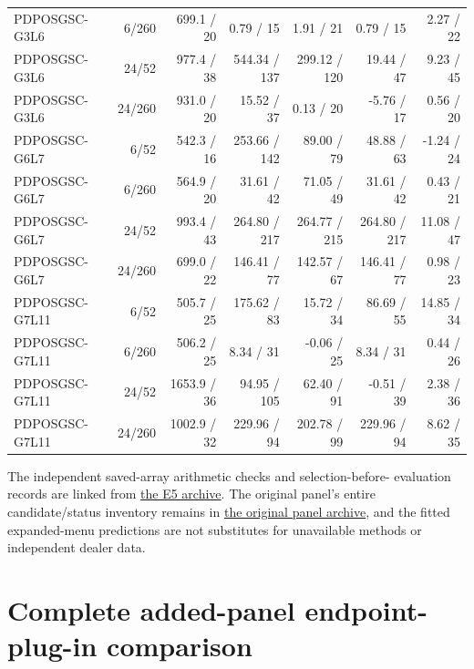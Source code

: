 \documentclass[11pt,a4paper]{article}
\begin{document}
\begin{longtable}{p{26mm}rrrrrr}
PDPOSGSC-G3L6 & 6/260 & 699.1 / 20 & 0.79 / 15 & 1.91 / 21 & 0.79 / 15 & 2.27 / 22 \\
PDPOSGSC-G3L6 & 24/52 & 977.4 / 38 & 544.34 / 137 & 299.12 / 120 & 19.44 / 47 & 9.23 / 45 \\
PDPOSGSC-G3L6 & 24/260 & 931.0 / 20 & 15.52 / 37 & 0.13 / 20 & -5.76 / 17 & 0.56 / 20 \\
PDPOSGSC-G6L7 & 6/52 & 542.3 / 16 & 253.66 / 142 & 89.00 / 79 & 48.88 / 63 & -1.24 / 24 \\
PDPOSGSC-G6L7 & 6/260 & 564.9 / 20 & 31.61 / 42 & 71.05 / 49 & 31.61 / 42 & 0.43 / 21 \\
PDPOSGSC-G6L7 & 24/52 & 993.4 / 43 & 264.80 / 217 & 264.77 / 215 & 264.80 / 217 & 11.08 / 47 \\
PDPOSGSC-G6L7 & 24/260 & 699.0 / 22 & 146.41 / 77 & 142.57 / 67 & 146.41 / 77 & 0.98 / 23 \\
PDPOSGSC-G7L11 & 6/52 & 505.7 / 25 & 175.62 / 83 & 15.72 / 34 & 86.69 / 55 & 14.85 / 34 \\
PDPOSGSC-G7L11 & 6/260 & 506.2 / 25 & 8.34 / 31 & -0.06 / 25 & 8.34 / 31 & 0.44 / 26 \\
PDPOSGSC-G7L11 & 24/52 & 1653.9 / 36 & 94.95 / 105 & 62.40 / 91 & -0.51 / 39 & 2.38 / 36 \\
PDPOSGSC-G7L11 & 24/260 & 1002.9 / 32 & 229.96 / 94 & 202.78 / 99 & 229.96 / 94 & 8.62 / 35 \\
\end{longtable}
\endgroup

The independent saved-array arithmetic checks and selection-before-
evaluation records are linked from \href{https://github.com/ByronLi0207/financial-mathematics-paper-20261020/blob/revision-v7-final/results/supervisor-20261023/e5/README.md}{the E5 archive}. The original panel's entire candidate/status inventory remains in
\href{https://github.com/ByronLi0207/financial-mathematics-paper-20261020/blob/revision-v7-final/results/revision-20261023/round2/panel/summary.csv}{the original panel archive},
and the fitted expanded-menu predictions are not substitutes for unavailable
methods or independent dealer data.\section{Complete added-panel endpoint-plug-in comparison}\label{sup:panel-levy}
\end{document}
